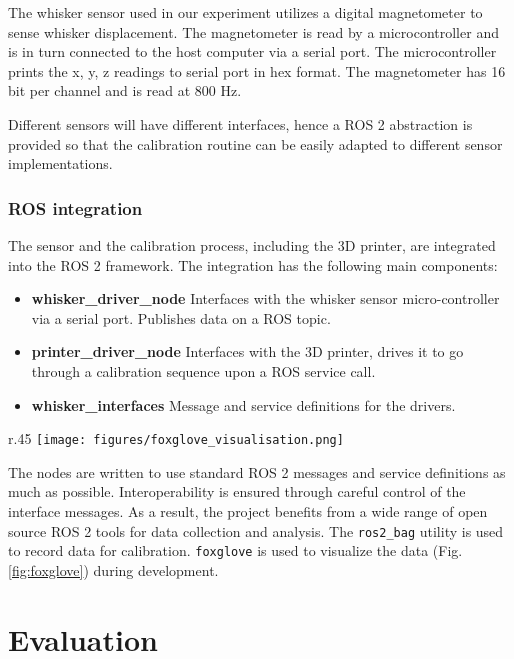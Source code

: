 \documentclass[runningheads]{llncs}
\begin{document}
The whisker sensor used in our experiment utilizes a digital magnetometer to sense whisker displacement. The magnetometer is read by a microcontroller and is in turn connected to the host computer via a serial port. The microcontroller prints the x, y, z readings to serial port in hex format. The magnetometer has 16 bit per channel and is read at 800 Hz.

Different sensors will have different interfaces, hence a ROS 2 abstraction is provided so that the calibration routine can be easily adapted to different sensor implementations.

\subsubsection{ROS integration}

The sensor and the calibration process, including the 3D printer, are integrated into the ROS 2 framework. The integration has the following main components:

\begin{itemize}
    \item \textbf{whisker\_driver\_node} Interfaces with the whisker sensor micro-controller via a serial port. Publishes data on a ROS topic.
    \item \textbf{printer\_driver\_node} Interfaces with the 3D printer, drives it to go through a calibration sequence upon a ROS service call.
    \item \textbf{whisker\_interfaces} Message and service definitions for the drivers.
\end{itemize}

\begin{wrapfigure}{r}{.45\textwidth}
    \centering
    \texttt{[image: figures/foxglove\_visualisation.png]}
    \caption{Foxglove visualization of whisker sensor system running in ROS 2}
    \label{fig:foxglove}
\end{wrapfigure}

The nodes are written to use standard ROS 2 messages and service definitions as much as possible. Interoperability is ensured through careful control of the interface messages. As a result, the project benefits from a wide range of open source ROS 2 tools for data collection and analysis. The \verb|ros2_bag| utility is used to record data for calibration. \verb|foxglove| is used to visualize the data (Fig. \ref{fig:foxglove}) during development.

\section{Evaluation}
\end{document}
